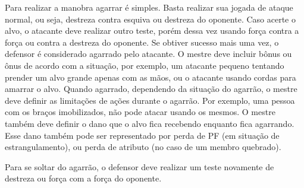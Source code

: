 Para realizar a manobra agarrar é simples. Basta realizar sua jogada de ataque normal, ou seja, destreza contra esquiva ou destreza do oponente. Caso acerte o alvo, o atacante deve realizar outro teste, porém dessa vez usando força contra a força ou contra a destreza do oponente. Se obtiver sucesso mais uma vez, o defensor é considerado agarrado pelo atacante. O mestre deve incluir bônus ou ônus de acordo com a situação, por exemplo, um atacante pequeno tentando prender um alvo grande apenas com as mãos, ou o atacante usando cordas para amarrar o alvo. Quando agarrado, dependendo da situação do agarrão, o mestre deve definir as limitações de ações durante o agarrão. Por exemplo, uma pessoa com os braços imobilizados, não pode atacar usando os mesmos. O mestre também deve definir o dano que o alvo fica recebendo enquanto fica agarrando. Esse dano também pode ser representado por perda de PF (em situação de estrangulamento), ou perda de atributo (no caso de um membro quebrado).

Para se soltar do agarrão, o defensor deve realizar um teste novamente de destreza ou força com a força do oponente.




  

